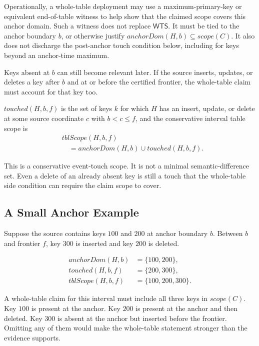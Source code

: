 \documentclass[letterpaper,10pt,twocolumn]{article}
\newcommand{\Scope}{\mathit{scope}}
\newcommand{\AnchorDomain}{\mathit{anchorDom}}
\newcommand{\TouchedBetween}{\mathit{touched}}
\newcommand{\TableScopeBetween}{\mathit{tblScope}}
\newcommand{\WTS}{\mathsf{WTS}}
\begin{document}
Operationally, a whole-table deployment may use a maximum-primary-key
or equivalent end-of-table witness to help show that the claimed scope
covers this anchor domain. Such a witness does not replace $\WTS$. It
must be tied to the anchor boundary $b$, or otherwise justify
$\AnchorDomain(H,b) \subseteq \Scope(C)$. It also does not discharge the
post-anchor touch condition below, including for keys beyond an
anchor-time maximum.

Keys absent at $b$ can still become relevant later. If the source
inserts, updates, or deletes a key after $b$ and at or before the
certified frontier, the whole-table claim must account for that key too.

$\TouchedBetween(H,b,f)$ is the set of keys $k$ for which $H$
has an insert, update, or delete at some source coordinate $c$
with $b < c \le f$, and the conservative interval table scope is
\[
\begin{aligned}
&\TableScopeBetween(H,b,f)\\
&\quad= \AnchorDomain(H,b) \cup \TouchedBetween(H,b,f).
\end{aligned}
\]

This is a conservative event-touch scope. It is not a minimal
semantic-difference set. Even a delete of an already absent key is still
a touch that the whole-table side condition can require the claim scope
to cover.

\subsection{A Small Anchor Example}\label{a-small-anchor-example}

Suppose the source contains keys $100$ and $200$ at anchor
boundary $b$. Between $b$ and frontier $f$, key
$300$ is inserted and key $200$ is deleted.

\[
\begin{aligned}
\AnchorDomain(H,b)&=\{100,200\},\\
\TouchedBetween(H,b,f)&=\{200,300\},\\
\TableScopeBetween(H,b,f)&=\{100,200,300\}.
\end{aligned}
\]

A whole-table claim for this interval must include all three keys in
$\Scope(C)$. Key $100$ is present at the anchor. Key
$200$ is present at the anchor and then deleted. Key $300$
is absent at the anchor but inserted before the frontier. Omitting any
of them would make the whole-table statement stronger than the evidence
supports.
\end{document}
